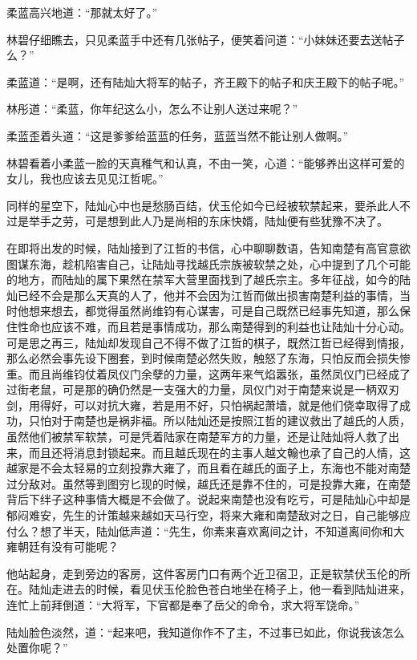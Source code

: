 柔蓝高兴地道：“那就太好了。”

林碧仔细瞧去，只见柔蓝手中还有几张帖子，便笑着问道：“小妹妹还要去送帖子么？”

柔蓝道：“是啊，还有陆灿大将军的帖子，齐王殿下的帖子和庆王殿下的帖子呢。”

林彤道：“柔蓝，你年纪这么小，怎么不让别人送过来呢？”

柔蓝歪着头道：“这是爹爹给蓝蓝的任务，蓝蓝当然不能让别人做啊。”

林碧看着小柔蓝一脸的天真稚气和认真，不由一笑，心道：“能够养出这样可爱的女儿，我也应该去见见江哲呢。”

同样的星空下，陆灿心中也是愁肠百结，伏玉伦如今已经被软禁起来，要杀此人不过是举手之劳，可是想到此人乃是尚相的东床快婿，陆灿便有些犹豫不决了。

在即将出发的时候，陆灿接到了江哲的书信，心中聊聊数语，告知南楚有高官意欲图谋东海，趁机陷害自己，让陆灿寻找越氏宗族被软禁之处，心中提到了几个可能的地方，而陆灿的属下果然在禁军大营里面找到了越氏宗主。多年征战，如今的陆灿已经不会是那么天真的人了，他并不会因为江哲而做出损害南楚利益的事情，当时他想来想去，都觉得虽然尚维钧有心谋害，可是自己既然已经事先知道，那么保住性命也应该不难，而且若是事情成功，那么南楚得到的利益也让陆灿十分心动。可是思之再三，陆灿却发现自己不得不做了江哲的棋子，既然江哲已经得到情报，那么必然会事先设下圈套，到时候南楚必然失败，触怒了东海，只怕反而会损失惨重。而且尚维钧仗着凤仪门余孽的力量，这两年来气焰嚣张，虽然凤仪门已经成了过街老鼠，可是那的确仍然是一支强大的力量，凤仪门对于南楚来说是一柄双刃剑，用得好，可以对抗大雍，若是用不好，只怕祸起萧墙，就是他们侥幸取得了成功，只怕对于南楚也是祸非福。所以陆灿还是按照江哲的建议救出了越氏的人质，虽然他们被禁军软禁，可是凭着陆家在南楚军方的力量，还是让陆灿将人救了出来，而且还将消息封锁起来。而且越氏现在的主事人越文翰也承了自己的人情，这越家是不会太轻易的立刻投靠大雍了，而且看在越氏的面子上，东海也不能对南楚过分敌对。虽然等到图穷匕现的时候，越氏还是靠不住的，可是投靠大雍，在南楚背后下绊子这种事情大概是不会做了。说起来南楚也没有吃亏，可是陆灿心中却是郁闷难安，先生的计策越来越如天马行空，将来大雍和南楚敌对之日，自己能够应付么？想了半天，陆灿低声道：“先生，你素来喜欢离间之计，不知道离间你和大雍朝廷有没有可能呢？

他站起身，走到旁边的客房，这件客房门口有两个近卫宿卫，正是软禁伏玉伦的所在。陆灿走进去的时候，看见伏玉伦脸色苍白地坐在椅子上，他一看到陆灿进来，连忙上前拜倒道：“大将军，下官都是奉了岳父的命令，求大将军饶命。”

陆灿脸色淡然，道：“起来吧，我知道你作不了主，不过事已如此，你说我该怎么处置你呢？”

